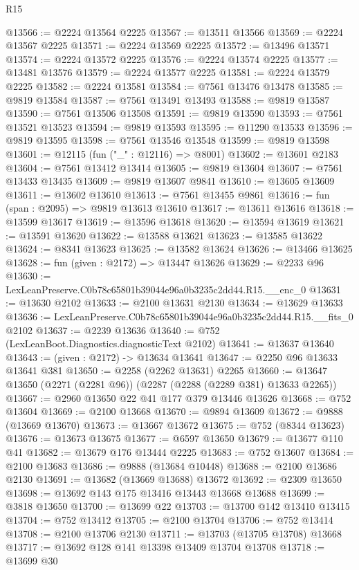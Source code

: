 \begin{lexlean}{R15}
\begin{coremodule}
@13566 := @2224 @13564 @2225
@13567 := @13511 @13566
@13569 := @2224 @13567 @2225
@13571 := @2224 @13569 @2225
@13572 := @13496 @13571
@13574 := @2224 @13572 @2225
@13576 := @2224 @13574 @2225
@13577 := @13481 @13576
@13579 := @2224 @13577 @2225
@13581 := @2224 @13579 @2225
@13582 := @2224 @13581
@13584 := @7561 @13476 @13478
@13585 := @9819 @13584
@13587 := @7561 @13491 @13493
@13588 := @9819 @13587
@13590 := @7561 @13506 @13508
@13591 := @9819 @13590
@13593 := @7561 @13521 @13523
@13594 := @9819 @13593
@13595 := @11290 @13533
@13596 := @9819 @13595
@13598 := @7561 @13546 @13548
@13599 := @9819 @13598
@13601 := @12115 (fun ("_" : @12116) => @8001)
@13602 := @13601 @2183
@13604 := @7561 @13412 @13414
@13605 := @9819 @13604
@13607 := @7561 @13433 @13435
@13609 := @9819 @13607 @9841
@13610 := @13605 @13609
@13611 := @13602 @13610
@13613 := @7561 @13455 @9861
@13616 := fun (span : @2095) => @9819 @13613 @13610
@13617 := @13611 @13616
@13618 := @13599 @13617
@13619 := @13596 @13618
@13620 := @13594 @13619
@13621 := @13591 @13620
@13622 := @13588 @13621
@13623 := @13585 @13622
@13624 := @8341 @13623
@13625 := @13582 @13624
@13626 := @13466 @13625
@13628 := fun (given : @2172) => @13447 @13626
@13629 := @2233 @96
@13630 := LexLeanPreserve.C0b78c65801b39044e96a0b3235c2dd44.R15.__enc_0
@13631 := @13630 @2102
@13633 := @2100 @13631 @2130
@13634 := @13629 @13633
@13636 := LexLeanPreserve.C0b78c65801b39044e96a0b3235c2dd44.R15.__fits_0 @2102
@13637 := @2239 @13636
@13640 := @752 (LexLeanBoot.Diagnostics.diagnosticText @2102)
@13641 := @13637 @13640
@13643 := (given : @2172) -> @13634 @13641
@13647 := @2250 @96 @13633 @13641 @381
@13650 := @2258 (@2262 @13631) @2265
@13660 := @13647 @13650 (@2271 (@2281 @96)) (@2287 (@2288 (@2289 @381) @13633 @2265))
@13667 := @2960 @13650 @22 @41 @177 @379 @13446 @13626
@13668 := @752 @13604
@13669 := @2100 @13668
@13670 := @9894 @13609
@13672 := @9888 (@13669 @13670)
@13673 := @13667 @13672
@13675 := @752 (@8344 @13623)
@13676 := @13673 @13675
@13677 := @6597 @13650
@13679 := @13677 @110 @41
@13682 := @13679 @176 @13444 @2225
@13683 := @752 @13607
@13684 := @2100 @13683
@13686 := @9888 (@13684 @10448)
@13688 := @2100 @13686 @2130
@13691 := @13682 (@13669 @13688) @13672
@13692 := @2309 @13650
@13698 := @13692 @143 @175 @13416 @13443 @13668 @13688
@13699 := @3818 @13650
@13700 := @13699 @22
@13703 := @13700 @142 @13410 @13415
@13704 := @752 @13412
@13705 := @2100 @13704
@13706 := @752 @13414
@13708 := @2100 @13706 @2130
@13711 := @13703 (@13705 @13708) @13668
@13717 := @13692 @128 @141 @13398 @13409 @13704 @13708
@13718 := @13699 @30

\end{coremodule}
\end{lexlean}
